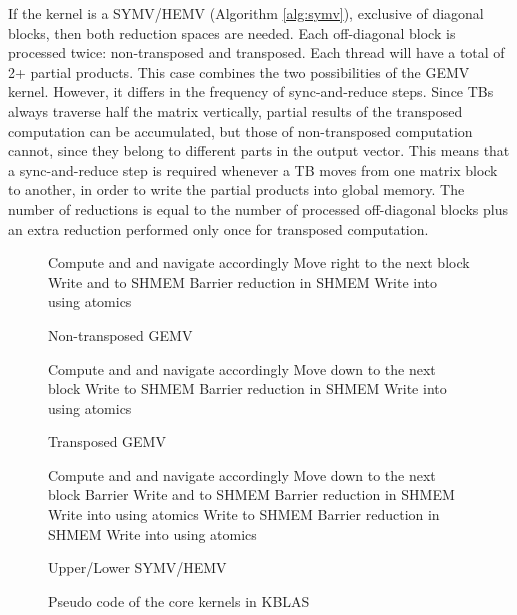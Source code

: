 If the kernel is a SYMV/HEMV (Algorithm \ref{alg:symv}), exclusive of diagonal blocks, then both reduction spaces are needed. Each off-diagonal block is processed 
twice: non-transposed and transposed. Each thread will have a total of 2+ partial products. This case combines the two possibilities of the 
GEMV kernel. However, it differs in the frequency of sync-and-reduce steps. Since TBs always traverse half the matrix vertically, partial 
results of the transposed computation can be accumulated, but those of non-transposed computation cannot, since they belong to different parts 
in the output vector. This means that a sync-and-reduce step is required whenever a TB moves from one matrix block to another, in order 
to write the partial products into global memory. The number of reductions is equal to the number of processed off-diagonal blocks plus an extra reduction 
performed only once for transposed computation. 

\begin{figure}
\noindent\begin{minipage}[][][t]{0.48\textwidth}
\begin{algorithm}[H]
\KwData{, , }
\KwResult{}
Compute  and  and navigate accordingly\;
 \;
  \;
\For{   \KwTo }
{
  \;
 \;
\If{}
{
Move right to the next block\;
  \;
}
 \;
}Write  and  to SHMEM\;
Barrier\;
\If{  }
{
reduction in SHMEM\;
Write  into  using atomics\;
}
\vspace{1.4mm}
\caption{Non-transposed GEMV}
\label{alg:gemvn}
\end{algorithm}
\end{minipage}
\noindent\begin{minipage}[][][t]{0.48\textwidth}
\begin{algorithm}[H]
\KwData{, , }
\KwResult{}
Compute  and  and navigate accordingly\;
 \;
  \;
\For{   \KwTo }
{
  \;
 \;
\If{}
{
Move down to the next block\;
  \;
}
 \;
}Write  to SHMEM\;
Barrier\;
\If{  }
{
reduction in SHMEM\;
Write  into  using atomics\;
}
\caption{Transposed GEMV}
\label{alg:gemvt}
\end{algorithm}
\end{minipage}
\begin{center}
\vspace{-1mm}
\noindent\begin{minipage}{0.48\textwidth}
\begin{algorithm}[H]
\KwData{, , }
\KwResult{}
Compute  and  and navigate accordingly\;
 \;
  \;
\For{   \KwTo }
{
  \;
 \;
 \;
\If{}
{
Move down to the next block\;
  \;
}
 \;
 \;
Barrier\;
Write  and  to SHMEM\;
Barrier\;
\If{  }
{
reduction in SHMEM\;
Write  into  using atomics\;
}
}Write  to SHMEM\;
Barrier\;
\If{  }
{
reduction in SHMEM\;
Write  into  using atomics\;
}
\caption{Upper/Lower SYMV/HEMV}
\label{alg:symv}
\end{algorithm}
\end{minipage}
\end{center}
\vspace{-2mm}
\caption{Pseudo code of the core kernels in KBLAS}
\label{fig:kblas_pseudocode}
\end{figure}

